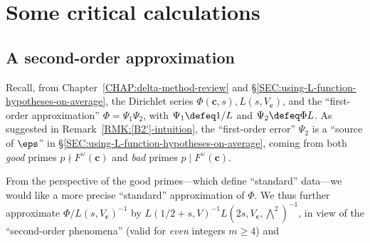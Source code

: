 \documentclass[12pt]{report}
\begin{document}


\section{Some critical calculations}

\subsection{A second-order approximation}
\label{SUBSEC:approx-Phi(c,s)-series-past-1/2-to-second-order}

Recall, from Chapter~\ref{CHAP:delta-method-review} and \S\ref{SEC:using-L-function-hypotheses-on-average},
the Dirichlet series $\Phi(\bm{c},s),L(s,V_{\bm{c}})$,
and the ``first-order approximation''
$\Phi = \Psi_1\Psi_2$,
with $\Psi_1\defeq 1/L$
and $\Psi_2\defeq \Phi L$.
As suggested in Remark~\ref{RMK:[B2']-intuition},
the ``first-order error'' $\Psi_2$
is a ``source of $\eps$'' in \S\ref{SEC:using-L-function-hypotheses-on-average},
coming from both \emph{good} primes $p\nmid F^\vee(\bm{c})$ and \emph{bad} primes $p\mid F^\vee(\bm{c})$.

From the perspective of the good primes---which define ``standard'' data---we would like a more precise ``standard'' approximation of $\Phi$.
We thus
further approximate $\Phi/L(s,V_{\bm{c}})^{-1}$ by $L(1/2+s,V)^{-1}L(2s,V_{\bm{c}},\bigwedge^2)^{-1}$,
in view of the ``second-order phenomena''
(valid for \emph{even} integers $m\geq4$)
and
\end{document}
